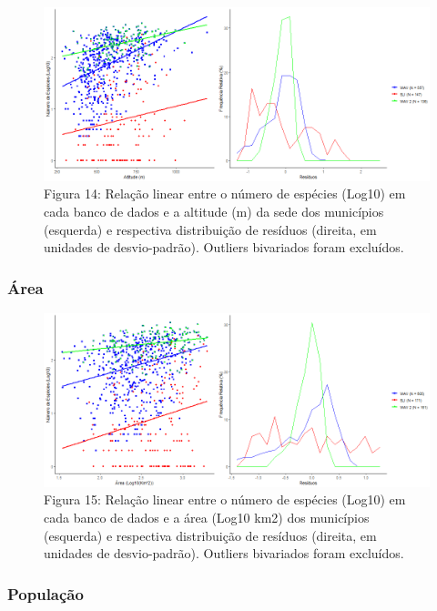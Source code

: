 \begin{figure}[h!]
\centering
\includegraphics[width = 15cm]{Imagens/32133.png}
\\{\scriptsize Figura 14: Relação linear entre o número de espécies (Log10) em cada banco de dados e a altitude (m) da sede dos municípios (esquerda) e respectiva distribuição de resíduos (direita, em unidades de desvio-padrão). Outliers bivariados foram excluídos.}
\end{figure}


\texto

\subsubsection{Área}



\begin{figure}[h!]
\centering
\includegraphics[width = 15cm]{Imagens/32233.png}
\\{\scriptsize Figura 15: Relação linear entre o número de espécies (Log10) em cada banco de dados e a área (Log10 km2) dos municípios (esquerda) e respectiva distribuição de resíduos (direita, em unidades de desvio-padrão). Outliers bivariados foram excluídos.}
\end{figure}

\texto

\subsubsection{População}

